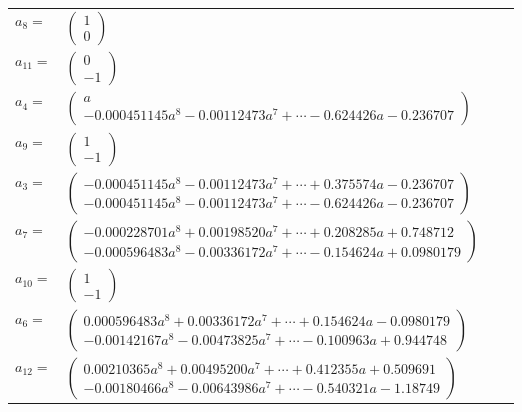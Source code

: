 \documentclass[1p]{elsarticle_modified}
\theoremstyle{definition}
\begin{document}
\begin{tabular}{m{7pt} m{180pt} m{7pt} m{180pt} }
\flushright $a_{8}=$&$\begin{pmatrix}1\\0\end{pmatrix}$ \\
\flushright $a_{11}=$&$\begin{pmatrix}0\\-1\end{pmatrix}$ \\
\flushright $a_{4}=$&$\begin{pmatrix}a\\-0.000451145 a^{8}-0.00112473 a^{7}+\cdots-0.624426 a-0.236707\end{pmatrix}$ \\
\flushright $a_{9}=$&$\begin{pmatrix}1\\-1\end{pmatrix}$ \\
\flushright $a_{3}=$&$\begin{pmatrix}-0.000451145 a^{8}-0.00112473 a^{7}+\cdots+0.375574 a-0.236707\\-0.000451145 a^{8}-0.00112473 a^{7}+\cdots-0.624426 a-0.236707\end{pmatrix}$ \\
\flushright $a_{7}=$&$\begin{pmatrix}-0.000228701 a^{8}+0.00198520 a^{7}+\cdots+0.208285 a+0.748712\\-0.000596483 a^{8}-0.00336172 a^{7}+\cdots-0.154624 a+0.0980179\end{pmatrix}$ \\
\flushright $a_{10}=$&$\begin{pmatrix}1\\-1\end{pmatrix}$ \\
\flushright $a_{6}=$&$\begin{pmatrix}0.000596483 a^{8}+0.00336172 a^{7}+\cdots+0.154624 a-0.0980179\\-0.00142167 a^{8}-0.00473825 a^{7}+\cdots-0.100963 a+0.944748\end{pmatrix}$ \\
\flushright $a_{12}=$&$\begin{pmatrix}0.00210365 a^{8}+0.00495200 a^{7}+\cdots+0.412355 a+0.509691\\-0.00180466 a^{8}-0.00643986 a^{7}+\cdots-0.540321 a-1.18749\end{pmatrix}$ \\

\end{tabular}
\end{document}

